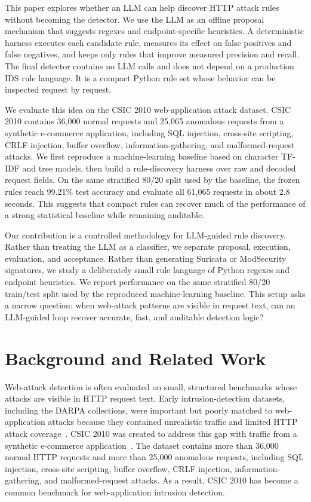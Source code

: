 \documentclass[letterpaper,twocolumn,10pt]{article}
\begin{document}
This paper explores whether an LLM can help discover HTTP attack rules without becoming the detector. We use the LLM as an offline proposal mechanism that suggests regexes and endpoint-specific heuristics. A deterministic harness executes each candidate rule, measures its effect on false positives and false negatives, and keeps only rules that improve measured precision and recall. The final detector contains no LLM calls and does not depend on a production IDS rule language. It is a compact Python rule set whose behavior can be inspected request by request.

We evaluate this idea on the CSIC 2010 web-application attack dataset. CSIC 2010 contains 36{,}000 normal requests and 25{,}065 anomalous requests from a synthetic e-commerce application, including SQL injection, cross-site scripting, CRLF injection, buffer overflow, information-gathering, and malformed-request attacks. We first reproduce a machine-learning baseline based on character TF-IDF and tree models, then build a rule-discovery harness over raw and decoded request fields. On the same stratified 80/20 split used by the baseline, the frozen rules reach 99.21\% test accuracy and evaluate all 61{,}065 requests in about 2.8 seconds. This suggests that compact rules can recover much of the performance of a strong statistical baseline while remaining auditable.

Our contribution is a controlled methodology for LLM-guided rule discovery. Rather than treating the LLM as a classifier, we separate proposal, execution, evaluation, and acceptance. Rather than generating Suricata or ModSecurity signatures, we study a deliberately small rule language of Python regexes and endpoint heuristics. We report performance on the same stratified 80/20 train/test split used by the reproduced machine-learning baseline. This setup asks a narrow question: when web-attack patterns are visible in request text, can an LLM-guided loop recover accurate, fast, and auditable detection logic?

\section{Background and Related Work}

Web-attack detection is often evaluated on small, structured benchmarks whose attacks are visible in HTTP request text. Early intrusion-detection datasets, including the DARPA collections, were important but poorly matched to web-application attacks because they contained unrealistic traffic and limited HTTP attack coverage~\cite{McHugh2000Critique}. CSIC 2010 was created to address this gap with traffic from a synthetic e-commerce application~\cite{CSIC2010}. The dataset contains more than 36{,}000 normal HTTP requests and more than 25{,}000 anomalous requests, including SQL injection, cross-site scripting, buffer overflow, CRLF injection, information-gathering, and malformed-request attacks. As a result, CSIC 2010 has become a common benchmark for web-application intrusion detection.
\end{document}
